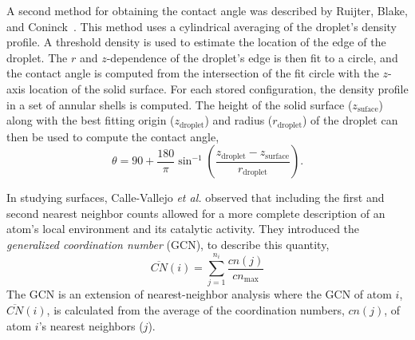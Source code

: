 \documentclass[]{book}
\begin{document}
A second method for obtaining the contact angle was described by
Ruijter, Blake, and Coninck~\cite{Ruijter99}.  This method uses a
cylindrical averaging of the droplet's density profile.  A threshold
density is used to estimate the location of the edge of the droplet.
The $r$ and $z$-dependence of the droplet's edge is then fit to a
circle, and the contact angle is computed from the intersection of the
fit circle with the $z$-axis location of the solid surface.  For each
stored configuration, the density profile in a set of annular shells
is computed.  The height of the solid surface ($z_\mathrm{suface}$)
along with the best fitting origin ($z_\mathrm{droplet}$) and radius
($r_\mathrm{droplet}$) of the droplet can then be used to compute the
contact angle,
\begin{equation}
\theta =  90 + \frac{180}{\pi} \sin^{-1}\left(\frac{z_\mathrm{droplet} -
  z_\mathrm{surface}}{r_\mathrm{droplet}} \right).
\end{equation}

In studying surfaces, Calle-Vallejo {\it et al.}  observed that
including the first and second nearest neighbor counts allowed for a
more complete description of an atom's local environment and its
catalytic activity.\cite{Calle-Vallejo:2015qq} They introduced the
\textit{generalized coordination number} (GCN), to describe this
quantity,
\begin{equation}
  \overline{CN}(i) = \sum_{j=1}^{n_i}\frac{cn(j)}{cn_{\textrm{max}}}
  \label{eq:gcn}
\end{equation}
The GCN is an extension of nearest-neighbor analysis where the GCN of
atom $i$, $\overline{CN}(i)$, is calculated from the average of the
coordination numbers, $cn(j)$, of atom $i$'s nearest neighbors ($j$).
\end{document}
